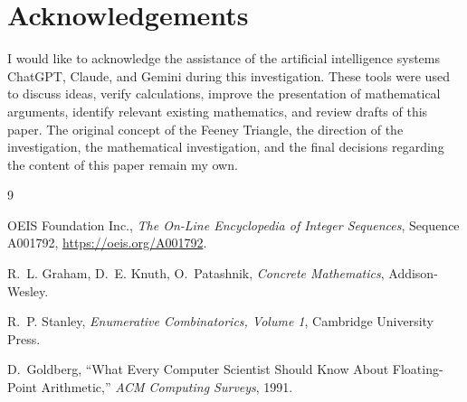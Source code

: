 \documentclass[11pt]{article}
\theoremstyle{definition}
\begin{document}
\section*{Acknowledgements}
I would like to acknowledge the assistance of the artificial intelligence systems ChatGPT, Claude, and Gemini during this investigation. These tools were used to discuss ideas, verify calculations, improve the presentation of mathematical arguments, identify relevant existing mathematics, and review drafts of this paper. The original concept of the Feeney Triangle, the direction of the investigation, the mathematical investigation, and the final decisions regarding the content of this paper remain my own.

\begin{thebibliography}{9}

OEIS Foundation Inc., \emph{The On-Line Encyclopedia of Integer Sequences}, Sequence A001792, \url{https://oeis.org/A001792}.

R.~L. Graham, D.~E. Knuth, O.~Patashnik, \emph{Concrete Mathematics}, Addison-Wesley.

R.~P. Stanley, \emph{Enumerative Combinatorics, Volume 1}, Cambridge University Press.

D.~Goldberg, ``What Every Computer Scientist Should Know About Floating-Point Arithmetic,'' \emph{ACM Computing Surveys}, 1991.

\end{thebibliography}
\end{document}
